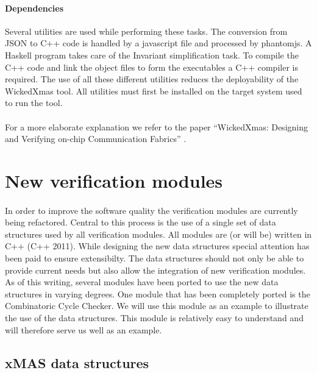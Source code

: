 \documentclass[a4paper,11pt]{article}
\begin{document}
\paragraph{Dependencies}
Several utilities are used while performing these tasks. The conversion from JSON to C++ code is
handled by a javascript file and processed by phantomjs. A Haskell program takes care of the
Invariant simplification task. To compile the C++ code and link the object files to form the
executables a C++ compiler is required. The use of all these different utilities reduces the
deployability of the WickedXmas tool. All utilities must first be installed on the target system used
to run the tool.

\paragraph{}
For a more elaborate explanation we refer to the paper ``WickedXmas: Designing and Verifying on-chip 
Communication Fabrics'' \cite{13_toolxmas}.


\section{New verification modules}

\paragraph{}
In order to improve the software quality the verification modules are currently being refactored.
Central to this process is the use of a single set of data structures used by all verification modules.
All modules are (or will be) written in C++ (C++ 2011). While designing the new data structures
special attention has been paid to ensure extensibilty. The data structures should not only be
able to provide current needs but also allow the integration of new verification modules. As of this
writing, several modules have been ported to use the new data structures in varying degrees. One
module that has been completely ported is the Combinatoric Cycle Checker. We will use this module
as an example to illustrate the use of the data structures. This module is relatively easy to
understand and will therefore serve us well as an example.

\subsection{xMAS data structures}
\end{document}
